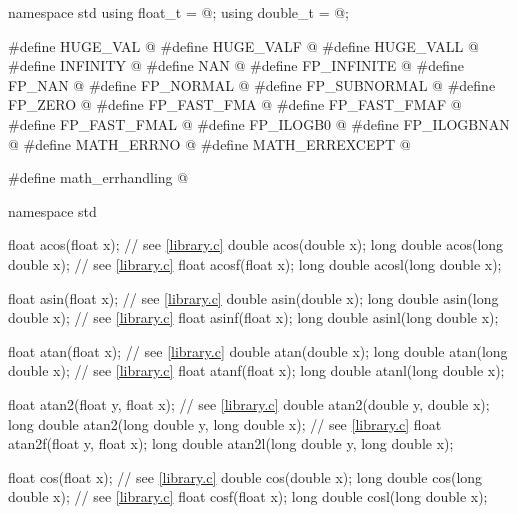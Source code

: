 %
%
%
%
%
%
%
%
%
%
%
%
%
%
%
%
%
%
%
%
%
%
%
%
%
%
\begin{codeblock}
namespace std {
  using float_t = @\seebelow@;
  using double_t = @\seebelow@;
}

#define HUGE_VAL @\seebelow@
#define HUGE_VALF @\seebelow@
#define HUGE_VALL @\seebelow@
#define INFINITY @\seebelow@
#define NAN @\seebelow@
#define FP_INFINITE @\seebelow@
#define FP_NAN @\seebelow@
#define FP_NORMAL @\seebelow@
#define FP_SUBNORMAL @\seebelow@
#define FP_ZERO @\seebelow@
#define FP_FAST_FMA @\seebelow@
#define FP_FAST_FMAF @\seebelow@
#define FP_FAST_FMAL @\seebelow@
#define FP_ILOGB0 @\seebelow@
#define FP_ILOGBNAN @\seebelow@
#define MATH_ERRNO @\seebelow@
#define MATH_ERREXCEPT @\seebelow@

#define math_errhandling @\seebelow@

namespace std {
  float acos(float x);  // see \ref{library.c}
  double acos(double x);
  long double acos(long double x);  // see \ref{library.c}
  float acosf(float x);
  long double acosl(long double x);

  float asin(float x);  // see \ref{library.c}
  double asin(double x);
  long double asin(long double x);  // see \ref{library.c}
  float asinf(float x);
  long double asinl(long double x);

  float atan(float x);                  // see \ref{library.c}
  double atan(double x);
  long double atan(long double x);      // see \ref{library.c}
  float atanf(float x);
  long double atanl(long double x);

  float atan2(float y, float x);        // see \ref{library.c}
  double atan2(double y, double x);
  long double atan2(long double y, long double x);  // see \ref{library.c}
  float atan2f(float y, float x);
  long double atan2l(long double y, long double x);

  float cos(float x);                   // see \ref{library.c}
  double cos(double x);
  long double cos(long double x);       // see \ref{library.c}
  float cosf(float x);
  long double cosl(long double x);

}
\end{codeblock}

